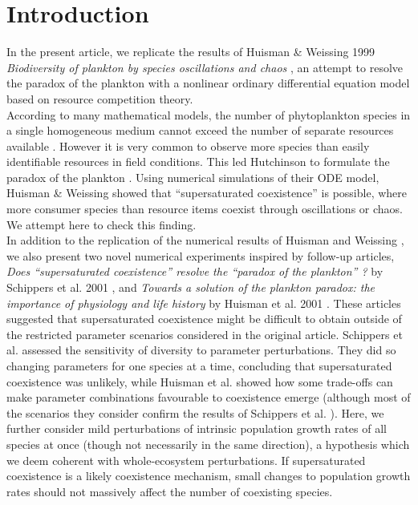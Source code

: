 \section{Introduction}
In the present article, we replicate the results of Huisman \& Weissing 1999 \textit{Biodiversity of plankton by species oscillations and chaos} \cite{1999:Huisman}, an attempt to resolve the paradox of the plankton \cite{1961:Hutchinson} with a nonlinear ordinary differential equation model based on resource competition theory.\\

According to many mathematical models, the number of phytoplankton species in a single homogeneous medium cannot exceed the number of separate resources available \cite{1960:Hardin,1973:Phillips,1980:Armstrong}. However it is very common to observe more species than easily identifiable resources in field conditions. This led Hutchinson to formulate the paradox of the plankton \cite{1961:Hutchinson}. Using numerical simulations of their ODE model, Huisman \& Weissing \cite{1999:Huisman} showed that ``supersaturated coexistence'' is possible, where more consumer species than resource items coexist through oscillations or chaos. We attempt here to check this finding. \\

In addition to the replication of the numerical results of Huisman and Weissing \cite{1999:Huisman}, we also present two novel numerical experiments inspired by follow-up articles, \textit{Does ``supersaturated coexistence'' resolve the ``paradox of the plankton'' ?} by Schippers et al. 2001 \cite{2001:Schippers}, and \textit{Towards a solution of the plankton paradox: the importance of physiology and life history} by Huisman et al. 2001 \cite{2001:Huisman}. These articles suggested that supersaturated coexistence might be difficult to obtain outside of the restricted parameter scenarios considered in the original article. Schippers et al. \cite{2001:Schippers} assessed the sensitivity of diversity to parameter perturbations. They did so changing parameters for one species at a time, concluding that supersaturated coexistence was unlikely, while Huisman et al. \cite{2001:Huisman} showed how some trade-offs can make parameter combinations favourable to coexistence emerge (although most of the scenarios they consider confirm the results of Schippers et al. \cite{2001:Schippers}). Here, we further consider mild perturbations of intrinsic population growth rates of all species at once (though not necessarily in the same direction), a hypothesis which we deem coherent with whole-ecosystem perturbations. If supersaturated coexistence is a likely coexistence mechanism, small changes to population growth rates should not massively affect the number of coexisting species. 

